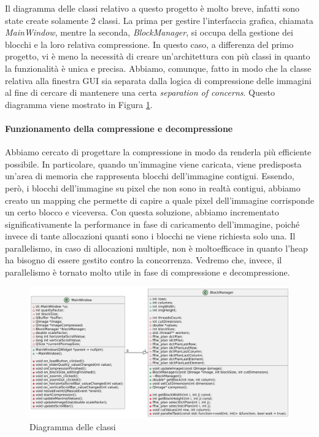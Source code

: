 Il diagramma delle classi relativo a questo progetto è molto breve, infatti sono state create solamente 2 classi. La prima per gestire l'interfaccia grafica, chiamata \textit{MainWindow}, mentre la seconda, \textit{BlockManager}, si occupa della gestione dei blocchi e la loro relativa compressione. In questo caso, a differenza del primo progetto, vi è meno la necessità di creare  un'architettura con più classi in quanto la funzionalità è unica e precisa. Abbiamo, comunque, fatto in modo che la classe relativa alla finestra GUI sia separata dalla logica di compressione delle immagini al fine di cercare di mantenere una certa \textit{separation of concerns}. Questo diagramma viene mostrato in Figura \ref{fig:class_diagram}.

\paragraph{Funzionamento della compressione e decompressione}
Abbiamo cercato di progettare la compressione in modo da renderla più efficiente possibile. In particolare, quando un'immagine viene caricata, viene predisposta un'area di memoria che rappresenta blocchi dell'immagine contigui. Essendo, però, i blocchi dell'immagine su pixel che non sono in realtà contigui, abbiamo creato un mapping che permette di capire a quale pixel dell'immagine corrisponde un certo blocco e viceversa. Con questa soluzione, abbiamo incrementato significativamente la performance in fase di caricamento dell'immagine, poiché invece di tante allocazioni quanti sono i blocchi ne viene richiesta solo una. Il parallelismo, in caso di allocazioni multiple, non è moltoefficace in quanto l'heap ha bisogno di essere gestito contro la concorrenza. Vedremo che, invece, il parallelismo è tornato molto utile in fase di compressione e decompressione.

\begin{figure}[h]
	\centering
	\includegraphics[width=1\linewidth]{figures/class diagram}
	\caption{Diagramma delle classi}
	\label{fig:class_diagram}
\end{figure}

